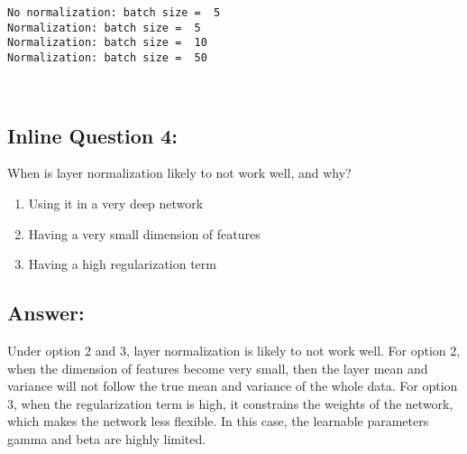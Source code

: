 \documentclass[11pt]{article}
\makeatletter
\providecommand{\tightlist}{%
      \setlength{\itemsep}{0pt}\setlength{\parskip}{0pt}}
\newcommand{\boxspacing}{\kern\kvtcb@left@rule\kern\kvtcb@boxsep}
\newcommand{\prompt}[4]{
        {\ttfamily\llap{{\color{#2}[#3]:\hspace{3pt}#4}}\vspace{-\baselineskip}}
    }
\makeatother
\begin{document}
    \begin{Verbatim}[commandchars=\\\{\}]
No normalization: batch size =  5
Normalization: batch size =  5
Normalization: batch size =  10
Normalization: batch size =  50
    \end{Verbatim}

    \begin{center}
    \end{center}
    { \hspace*{\fill} \\}
    
    \hypertarget{inline-question-4}{%
\subsection{Inline Question 4:}\label{inline-question-4}}

When is layer normalization likely to not work well, and why?

\begin{enumerate}
\def\labelenumi{\arabic{enumi}.}
\tightlist
\item
  Using it in a very deep network
\item
  Having a very small dimension of features
\item
  Having a high regularization term
\end{enumerate}

\hypertarget{answer}{%
\subsection{Answer:}\label{answer}}

Under option 2 and 3, layer normalization is likely to not work well.
For option 2, when the dimension of features become very small, then the
layer mean and variance will not follow the true mean and variance of
the whole data. For option 3, when the regularization term is high, it
constrains the weights of the network, which makes the network less
flexible. In this case, the learnable parameters gamma and beta are
highly limited.

    \begin{tcolorbox}[breakable, size=fbox, boxrule=1pt, pad at break*=1mm,colback=cellbackground, colframe=cellborder]
\prompt{In}{incolor}{ }{\boxspacing}
\begin{Verbatim}[commandchars=\\\{\}]

\end{Verbatim}
\end{tcolorbox}


    
    
    
\end{document}
